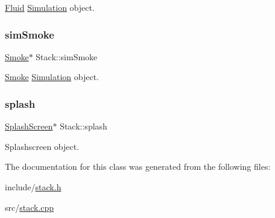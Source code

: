 \mbox{\hyperlink{classFluid}{Fluid}} \mbox{\hyperlink{classSimulation}{Simulation}} object. 

\mbox{\label{classStack_a0eb428edacee758da17e9b8a8943db79}} 
\subsubsection{\texorpdfstring{simSmoke}{simSmoke}}
{\footnotesize\ttfamily \mbox{\hyperlink{classSmoke}{Smoke}}$\ast$ Stack\+::sim\+Smoke\hspace{0.3cm}{\ttfamily [private]}}



\mbox{\hyperlink{classSmoke}{Smoke}} \mbox{\hyperlink{classSimulation}{Simulation}} object. 

\mbox{\label{classStack_a2d3f7bf6df4a15c81ed677fd728dda4c}} 
\subsubsection{\texorpdfstring{splash}{splash}}
{\footnotesize\ttfamily \mbox{\hyperlink{classSplashScreen}{Splash\+Screen}}$\ast$ Stack\+::splash\hspace{0.3cm}{\ttfamily [private]}}



Splashscreen object. 



The documentation for this class was generated from the following files\+:\begin{DoxyCompactItemize}
\item 
include/\mbox{\hyperlink{stack_8h}{stack.\+h}}\item 
src/\mbox{\hyperlink{stack_8cpp}{stack.\+cpp}}\end{DoxyCompactItemize}

